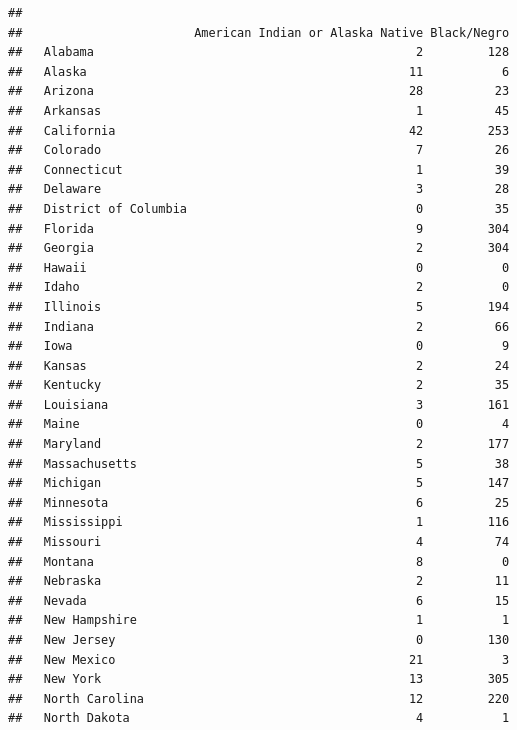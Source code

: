 \documentclass[]{book}
\newenvironment{Shaded}{\begin{snugshade}}{\end{snugshade}}
\theoremstyle{definition}
\theoremstyle{definition}
\theoremstyle{definition}
\theoremstyle{remark}
\begin{document}
\begin{Shaded}
\begin{Highlighting}[]
\begin{Shaded}
\begin{Highlighting}[]
\begin{verbatim}
##                       
##                        American Indian or Alaska Native Black/Negro
##   Alabama                                             2         128
##   Alaska                                             11           6
##   Arizona                                            28          23
##   Arkansas                                            1          45
##   California                                         42         253
##   Colorado                                            7          26
##   Connecticut                                         1          39
##   Delaware                                            3          28
##   District of Columbia                                0          35
##   Florida                                             9         304
##   Georgia                                             2         304
##   Hawaii                                              0           0
##   Idaho                                               2           0
##   Illinois                                            5         194
##   Indiana                                             2          66
##   Iowa                                                0           9
##   Kansas                                              2          24
##   Kentucky                                            2          35
##   Louisiana                                           3         161
##   Maine                                               0           4
##   Maryland                                            2         177
##   Massachusetts                                       5          38
##   Michigan                                            5         147
##   Minnesota                                           6          25
##   Mississippi                                         1         116
##   Missouri                                            4          74
##   Montana                                             8           0
##   Nebraska                                            2          11
##   Nevada                                              6          15
##   New Hampshire                                       1           1
##   New Jersey                                          0         130
##   New Mexico                                         21           3
##   New York                                           13         305
##   North Carolina                                     12         220
##   North Dakota                                        4           1

\end{verbatim}
\end{Highlighting}
\end{Shaded}
\end{Highlighting}
\end{Shaded}
\end{document}
